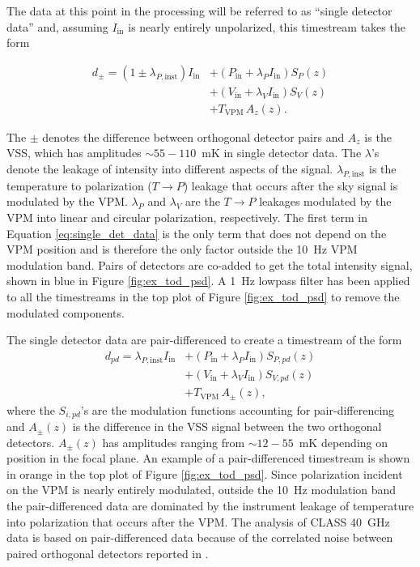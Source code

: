 \documentclass[twocolumn, tighten, numberedappendix, twocolappendix]{aastex63}
\begin{document}
The data at this point in the processing will be referred to as ``single detector data'' and, assuming $I_\mathrm{in}$ is nearly entirely unpolarized, this timestream takes the form 

\begin{equation}
\begin{aligned}
    d_{\pm} = (1\pm\lambda_{P,\mathrm{inst}}) I_\mathrm{in} &+ (P_\mathrm{in}+\lambda_P I_\mathrm{in}) S_P(z)  \\
     &+ (V_\mathrm{in}+\lambda_V I_\mathrm{in}) S_V(z)\\
     & + T_\mathrm{VPM} \, A_{z}(z).
\end{aligned}
\label{eq:single_det_data}
\end{equation}

\noindent The $\pm$ denotes the difference between orthogonal detector pairs and $A_z$ is the VSS, which has amplitudes {$\sim 55-110$~mK} in single detector data. The $\lambda$'s denote the leakage of intensity into different aspects of the signal. $\lambda_{P,\mathrm{inst}}$ is the temperature to polarization ($T\rightarrow P$) leakage that occurs after the sky signal is modulated by the VPM. $\lambda_{P}$ and $\lambda_{V}$ are the $T\rightarrow P$ leakages modulated by the VPM into linear and circular polarization, respectively. The first term in Equation \ref{eq:single_det_data} is the only term that does not depend on the VPM position and is therefore the only factor outside the 10~Hz VPM modulation band. Pairs of detectors are co-added to get the total intensity signal, shown in blue in Figure \ref{fig:ex_tod_psd}. A 1~Hz lowpass filter has been applied to all the timestreams in the top plot of Figure \ref{fig:ex_tod_psd} to remove the modulated components.

The single detector data are pair-differenced to create a timestream of the form
\begin{equation}
\begin{aligned}
    d_{pd} = \lambda_{P,\mathrm{inst}} I_\mathrm{in} & + (P_\mathrm{in}+\lambda_P I_\mathrm{in}) S_{P,pd}(z)  \\
     & + (V_\mathrm{in}+\lambda_V I_\mathrm{in}) S_{V,pd}(z)\\
     & + T_\mathrm{VPM} \, A_{\pm}(z),
\end{aligned}
\label{eq:real_pd}
\end{equation}
\noindent where the $S_{i,pd}$'s are the modulation functions accounting for pair-differencing and $A_{\pm}(z)$ is the difference in the VSS signal between the two orthogonal detectors. $A_{\pm}(z)$ has amplitudes ranging from {$\sim 12-55$~mK} depending on position in the focal plane. An example of a pair-differenced timestream is shown in orange in the top plot of Figure \ref{fig:ex_tod_psd}. Since polarization incident on the VPM is nearly entirely modulated, outside the 10~Hz modulation band the pair-differenced data are dominated by the instrument leakage of temperature into polarization that occurs after the VPM. The analysis of CLASS 40~GHz data is based on pair-differenced data because of the correlated noise between paired orthogonal detectors reported in \cite{appe19}.
\end{document}
